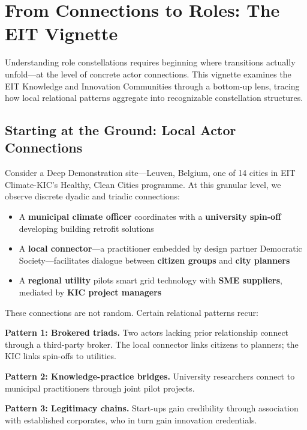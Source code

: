 \documentclass[../main.tex]{subfiles}
\begin{document}
\section{From Connections to Roles: The EIT Vignette}

Understanding role constellations requires beginning where transitions actually unfold---at the level of concrete actor connections. This vignette examines the EIT Knowledge and Innovation Communities through a bottom-up lens, tracing how local relational patterns aggregate into recognizable constellation structures.

\subsection{Starting at the Ground: Local Actor Connections}

Consider a Deep Demonstration site---Leuven, Belgium, one of 14 cities in EIT Climate-KIC's Healthy, Clean Cities programme. At this granular level, we observe discrete dyadic and triadic connections:

\begin{itemize}[noitemsep,topsep=2pt]
    \item A \textbf{municipal climate officer} coordinates with a \textbf{university spin-off} developing building retrofit solutions
    \item A \textbf{local connector}---a practitioner embedded by design partner Democratic Society---facilitates dialogue between \textbf{citizen groups} and \textbf{city planners}
    \item A \textbf{regional utility} pilots smart grid technology with \textbf{SME suppliers}, mediated by \textbf{KIC project managers}
\end{itemize}

These connections are not random. Certain relational patterns recur:

\textbf{Pattern 1: Brokered triads.} Two actors lacking prior relationship connect through a third-party broker. The local connector links citizens to planners; the KIC links spin-offs to utilities.

\textbf{Pattern 2: Knowledge-practice bridges.} University researchers connect to municipal practitioners through joint pilot projects.

\textbf{Pattern 3: Legitimacy chains.} Start-ups gain credibility through association with established corporates, who in turn gain innovation credentials.
\end{document}
